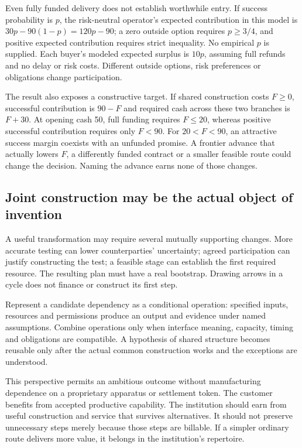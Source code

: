 Even fully funded delivery does not establish worthwhile entry. If success probability is $p$, the risk-neutral operator's expected contribution in this model is $30p-90(1-p)=120p-90$; a zero outside option requires $p\geq3/4$, and positive expected contribution requires strict inequality. No empirical $p$ is supplied. Each buyer's modeled expected surplus is $10p$, assuming full refunds and no delay or risk costs. Different outside options, risk preferences or obligations change participation.

The result also exposes a constructive target. If shared construction costs $F\geq0$, successful contribution is $90-F$ and required cash across these two branches is $F+30$. At opening cash 50, full funding requires $F\leq20$, whereas positive successful contribution requires only $F<90$. For $20<F<90$, an attractive success margin coexists with an unfunded promise. A frontier advance that actually lowers $F$, a differently funded contract or a smaller feasible route could change the decision. Naming the advance earns none of those changes.

\subsection{Joint construction may be the actual object of invention}
A useful transformation may require several mutually supporting changes. More accurate testing can lower counterparties' uncertainty; agreed participation can justify constructing the test; a feasible stage can establish the first required resource. The resulting plan must have a real bootstrap. Drawing arrows in a cycle does not finance or construct its first step.

Represent a candidate dependency as a conditional operation: specified inputs, resources and permissions produce an output and evidence under named assumptions. Combine operations only when interface meaning, capacity, timing and obligations are compatible. A hypothesis of shared structure becomes reusable only after the actual common construction works and the exceptions are understood.

This perspective permits an ambitious outcome without manufacturing dependence on a proprietary apparatus or settlement token. The customer benefits from accepted productive capability. The institution should earn from useful construction and service that survives alternatives. It should not preserve unnecessary steps merely because those steps are billable. If a simpler ordinary route delivers more value, it belongs in the institution's repertoire.

